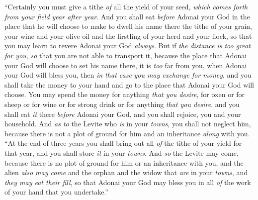 \begin{biblechapter}
\verse “Certainly you must give a tithe \textit{of} all the yield of your seed, \textit{which comes forth from your field year after year}.
\verse And you shall eat \textit{before} Adonai your God in the place that he will choose to make to dwell his name there the tithe of your grain, your wine and your olive oil and the firstling of your herd and your flock, so that you may learn to revere Adonai your God \textit{always}.
\verse But if \textit{the distance is too great for you}, \textit{so} that you are not able to transport it, because the place that Adonai your God will choose to set his name there, it is \textit{too} far from you, when Adonai your God will bless you,
\verse then \textit{in that case} \textit{you may exchange for money}, and you shall take the money to your hand and go to the place that Adonai your God will choose.
\verse You may spend the money for anything \textit{that you desire}, for oxen or for sheep or for wine or for strong drink or for anything \textit{that you desire}, and you shall eat \textit{it} there \textit{before} Adonai your God, and you shall rejoice, you and your household.
\verse And \textit{as to} the Levite who \textit{is} in your \textit{towns}, you shall not neglect him, because there is not a plot of ground for him and an inheritance \textit{along} with you.
\verse “At the end of three years you shall bring out all \textit{of} the tithe of your yield for that year, and you shall store \textit{it} in your \textit{towns}.
\verse And \textit{so} the Levite may come, because there is no plot of ground for him or an inheritance with you, and the alien \textit{also may come} and the orphan and the widow that \textit{are} in your \textit{towns}, and \textit{they may eat their fill}, so that Adonai your God may bless you in all \textit{of} the work of your hand that you undertake.”
\end{biblechapter}

